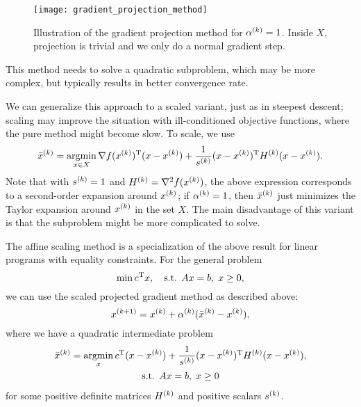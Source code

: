 \documentclass{article}
\begin{document}
\begin{figure}[H]
  \centering
  \texttt{[image: gradient\_projection\_method]}
  \caption{Illustration of the gradient projection method for \(\kth{\alpha} = 1\).  Inside \(X\),
    projection is trivial and we only do a normal gradient
    step.\label{fig:gradient-projection-method}}
\end{figure}

This method needs to solve a quadratic subproblem, which may be more complex, but typically results
in better convergence rate.

We can generalize this approach to a scaled variant, just as in steepest descent; scaling may
improve the situation with ill-conditioned objective functions, where the pure method might become
slow.  To scale, we use
\begin{equation*}
  \kth{\bar{x}} = \argmin_{x \in X} \T{\nabla f(\kth{x})} (x - \kth{x}) +
  \frac{1}{\kth{s}} \T{(x - \kth{x})} \kth{H} (x - \kth{x}).
\end{equation*}
Note that with \(\kth{s} = 1\) and \(\kth{H} = \nabla^2 f(\kth{x})\), the above expression
corresponds to a second-order expansion around \(\kth{x}\); if \(\kth{\alpha} = 1\), then
\(\kth{\bar{x}}\) just minimizes the Taylor expansion around \(\kth{x}\) in the set \(X\).  The main
disadvantage of this variant is that the subproblem might be more complicated to solve.



\label{s:affine-scaling-method}


The affine scaling method is a specialization of the above result for linear programs with equality
constraints.  For the general problem
\begin{equation*}
  \min \T{c} x, \quad\text{s.t. } Ax = b, \; x \geq 0,
\end{equation*}
we can use the scaled projected gradient method as described above:
\begin{equation*}
  \kth[k+1]{x} = \kth{x} + \kth{\alpha}(\kth{\bar{x}} - \kth{x}),
\end{equation*}
where we have a quadratic intermediate problem
\begin{gather*}
  \kth{\bar{x}} = \argmin_x \T{c}(x - \kth{x})
  + \frac{1}{\kth{s}} \T{(x - \kth{x})} \kth{H} (x - \kth{x}),\\
  \text{s.t. } Ax = b, \; x \geq 0
\end{gather*}
for some positive definite matrices \(\kth{H}\) and positive scalars \(\kth{s}\).
\end{document}
